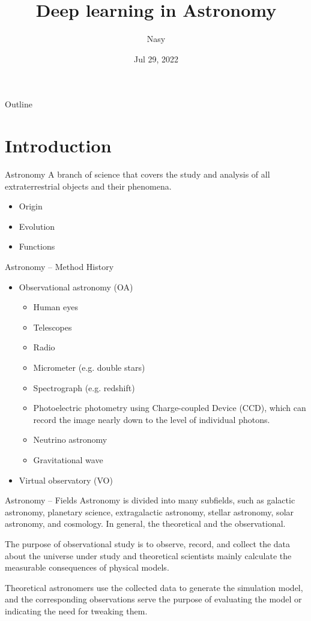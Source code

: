 \documentclass[aspectratio=1610,xcolor={dvipsnames},hyperref={colorlinks,unicode,linkcolor=violet,anchorcolor=blueviolet,citecolor=YellowOrange,filecolor=black,urlcolor=Aquamarine}]{beamer}
\author{Nasy}
\date{Jul 29, 2022}
\title{Deep learning in Astronomy}
\begin{document}
\maketitle
\begin{frame}{Outline}
\tableofcontents
\end{frame}


\section{Introduction}
\label{sec:org32177cb}

\begin{frame}[label={sec:org955d099}]{Astronomy}
A branch of science that covers the study and analysis of all extraterrestrial objects and their phenomena.

\begin{itemize}
\item Origin
\item Evolution
\item Functions
\end{itemize}
\end{frame}

\begin{frame}[label={sec:orgfbee5af}]{Astronomy -- Method History}
\begin{itemize}
\item Observational astronomy (OA)
\begin{itemize}
\item Human eyes
\item Telescopes
\item Radio
\item Micrometer (e.g. double stars)
\item Spectrograph (e.g. redshift)
\item Photoelectric photometry using Charge-coupled Device (CCD), which
can record the image nearly down to the level of individual
photons.
\item Neutrino astronomy
\item Gravitational wave
\end{itemize}
\item Virtual observatory (VO)
\end{itemize}
\end{frame}

\begin{frame}[label={sec:orga81759b}]{Astronomy -- Fields}
Astronomy is divided into many subfields, such as galactic astronomy,
planetary science, extragalactic astronomy, stellar astronomy, solar
astronomy, and cosmology.  In general, the theoretical and the
observational.

The purpose of observational study is to observe, record, and collect
the data about the universe under study and theoretical scientists
mainly calculate the measurable consequences of physical models.

Theoretical astronomers use the collected data to generate the
simulation model, and the corresponding observations serve the purpose
of evaluating the model or indicating the need for tweaking them.
\end{frame}
\end{document}
